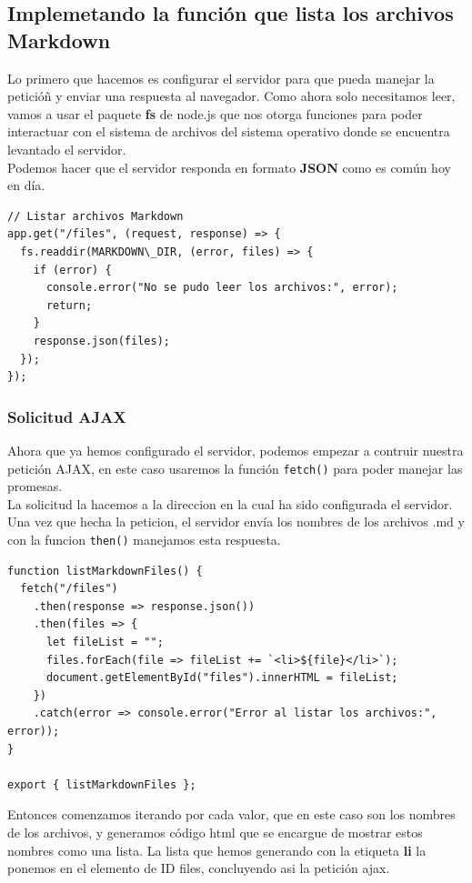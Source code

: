 \subsection{Implemetando la función que lista los archivos Markdown}
Lo primero que hacemos es configurar el servidor para que pueda manejar la peticióñ y enviar una respuesta al navegador. Como ahora solo necesitamos leer, vamos a usar el paquete \textbf{fs} de node.js que nos otorga funciones para poder interactuar con el sistema de archivos del sistema operativo donde se encuentra levantado el servidor.\\
\singlespacing
Podemos hacer que el servidor responda en formato \textbf{JSON} como es común hoy en día.

\begin{verbatim}
// Listar archivos Markdown
app.get("/files", (request, response) => {
  fs.readdir(MARKDOWN\_DIR, (error, files) => {
    if (error) {
      console.error("No se pudo leer los archivos:", error);
      return;
    }
    response.json(files);
  });
});
\end{verbatim}

\subsubsection{Solicitud AJAX}
Ahora que ya hemos configurado el servidor, podemos empezar a contruir nuestra petición AJAX, en este caso usaremos la función \texttt{fetch()} para poder manejar las promesas.\\
La solicitud la hacemos a la direccion en la cual ha sido configurada el servidor. Una vez que hecha la peticion, el servidor envía los nombres de los archivos .md y con la funcion \texttt{then()} manejamos esta respuesta. 

\begin{verbatim}
function listMarkdownFiles() {
  fetch("/files")
    .then(response => response.json())
    .then(files => {
      let fileList = "";
      files.forEach(file => fileList += `<li>${file}</li>`);
      document.getElementById("files").innerHTML = fileList;
    })
    .catch(error => console.error("Error al listar los archivos:", error));
}

export { listMarkdownFiles };
\end{verbatim}

Entonces comenzamos iterando por cada valor, que en este caso son los nombres de los archivos, y generamos código html que se encargue de mostrar estos nombres como una lista. La lista que hemos generando con la etiqueta \textbf{li} la ponemos en el elemento de ID files, concluyendo asi la petición ajax.


